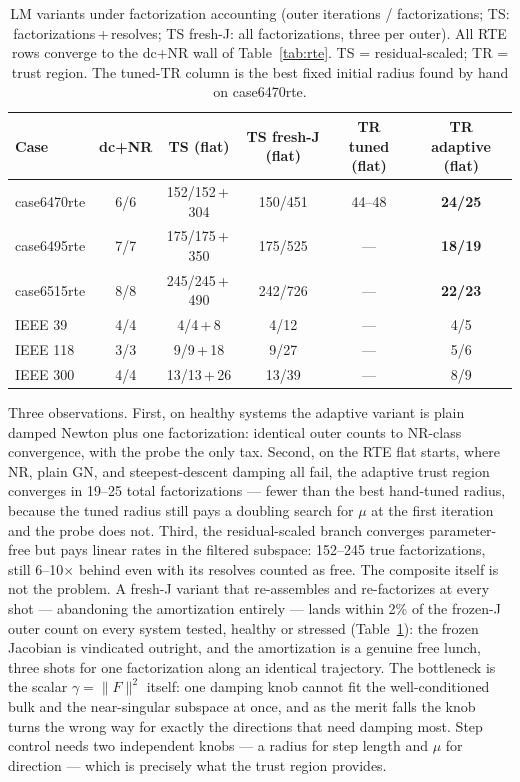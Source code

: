 \documentclass[11pt]{article}
\begin{document}
\begin{table}[h]
\centering
\caption{LM variants under factorization accounting
(outer iterations / factorizations; TS: factorizations\,+\,resolves;
TS fresh-J: all factorizations, three per outer).
All RTE rows converge to the dc+NR wall of Table~\ref{tab:rte}.
TS = residual-scaled; TR = trust region. The tuned-TR column is the best
fixed initial radius found by hand on case6470rte.}
\label{tab:variants}
\begin{tabular}{lccccc}
\toprule
Case & dc+NR & TS (flat) & TS fresh-J (flat) & TR tuned (flat) & TR adaptive (flat) \\
\midrule
case6470rte & 6/6  & 152/152\,+\,304 & 150/451 & 44--48 & \textbf{24/25} \\
case6495rte & 7/7  & 175/175\,+\,350 & 175/525 & ---    & \textbf{18/19} \\
case6515rte & 8/8  & 245/245\,+\,490 & 242/726 & ---    & \textbf{22/23} \\
\midrule
IEEE 39     & 4/4  & 4/4\,+\,8    & 4/12   & ---    & 4/5 \\
IEEE 118    & 3/3  & 9/9\,+\,18   & 9/27   & ---    & 5/6 \\
IEEE 300    & 4/4  & 13/13\,+\,26 & 13/39  & ---    & 8/9 \\
\bottomrule
\end{tabular}
\end{table}

Three observations. First, on healthy systems the adaptive variant is plain
damped Newton plus one factorization: identical outer counts to NR-class
convergence, with the probe the only tax. Second, on the RTE flat starts,
where NR, plain GN, and steepest-descent damping all fail, the adaptive
trust region converges in 19--25 total factorizations --- fewer than the
best hand-tuned radius, because the tuned radius still pays a doubling
search for $\mu$ at the first iteration and the probe does not. Third, the
residual-scaled branch converges parameter-free but pays linear rates in
the filtered subspace: 152--245 true factorizations, still 6--10$\times$
behind even with its resolves counted as free.
The composite itself is not the problem. A fresh-J variant that
re-assembles and re-factorizes at every shot --- abandoning the
amortization entirely --- lands within 2\% of the frozen-J outer count on
every system tested, healthy or stressed (Table~\ref{tab:variants}): the
frozen Jacobian is vindicated outright, and the amortization is a genuine
free lunch, three shots for one factorization along an identical
trajectory. The bottleneck is the scalar $\gamma = \|F\|^2$ itself: one
damping knob cannot fit the well-conditioned bulk and the near-singular
subspace at once, and as the merit falls the knob turns the wrong way for
exactly the directions that need damping most. Step control needs two
independent knobs --- a radius for step length and $\mu$ for direction ---
which is precisely what the trust region provides.
\end{document}
